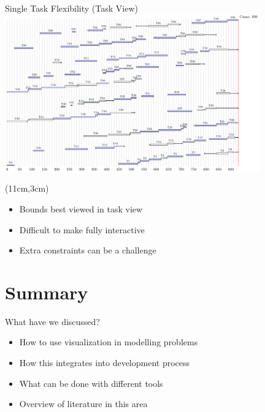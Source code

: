 \documentclass[dvipsnames,aspectratio=169]{beamer}
\begin{document}
\begin{frame}{Single Task Flexibility (Task View)}
\includegraphics[width=11cm]{images/mt10taskfreedom}
\begin{textblock*}{4.5cm}(11cm,3cm)
\begin{itemize}
\item Bounds best viewed in task view
    \item Difficult to make fully interactive 
    \item Extra constraints can be a challenge
\end{itemize}
\end{textblock*}
\end{frame}


\section{Summary}

\begin{frame}{What have we discussed?}
\begin{itemize}
    \item How to use visualization in modelling problems
    \item How this integrates into development process
    \item What can be done with different tools
    \item Overview of literature in this area
\end{itemize}    
\end{frame}
\end{document}
